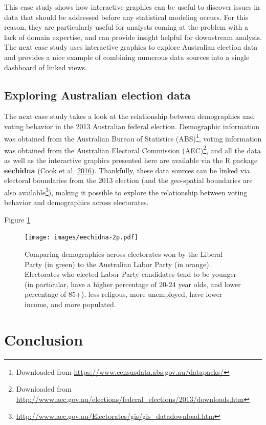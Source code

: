 \documentclass[12pt,]{isuthesis}
\let\rmarkdownfootnote\footnote%
\def\footnote{\protect\rmarkdownfootnote}
\begin{document}
This case study shows how interactive graphics can be useful to discover
issues in data that should be addressed before any statistical modeling
occurs. For this reason, they are particularly useful for analysts
coming at the problem with a lack of domain expertise, and can provide
insight helpful for downstream analysis. The next case study uses
interactive graphics to explore Australian election data and provides a
nice example of combining numerous data sources into a single dashboard
of linked views.

\hypertarget{exploring-australian-election-data}{\subsection{Exploring
Australian election data}\label{exploring-australian-election-data}}

The next case study takes a look at the relationship between
demographics and voting behavior in the 2013 Australian federal
election. Demographic information was obtained from the Australian
Bureau of Statistics (ABS)\footnote{Downloaded from
  \url{https://www.censusdata.abs.gov.au/datapacks/}}, voting
information was obtained from the Australian Electoral Commission
(AEC)\footnote{Downloaded from
  \url{http://www.aec.gov.au/elections/federal_elections/2013/downloads.htm}},
and all the data as well as the interactive graphics presented here are
available via the R package \textbf{eechidna} (Cook et al.
\protect\hyperlink{ref-eechidna}{2016}). Thankfully, these data sources
can be linked via electoral boundaries from the 2013 election (and the
geo-spatial boundaries are also available\footnote{\url{http://www.aec.gov.au/Electorates/gis/gis_datadownload.htm}}),
making it possible to explore the relationship between voting behavior
and demographics across electorates.

Figure \ref{fig:eechidna-2p}

\begin{figure}
\centering
\texttt{[image: images/eechidna-2p.pdf]}
\caption{\label{fig:eechidna-2p}Comparing demographics across electorates
won by the Liberal Party (in green) to the Australian Labor Party (in
orange). Electorates who elected Labor Party candidates tend to be
younger (in particular, have a higher percentage of 20-24 year olds, and
lower percentage of 85+), less religous, more unemployed, have lower
income, and more populated.}
\end{figure}

\section{Conclusion}\label{conclusion-2}
\end{document}
